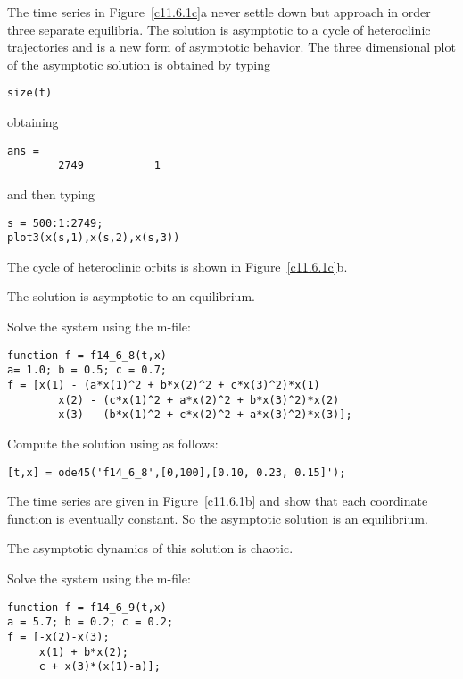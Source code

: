 The time series in Figure~\ref{c11.6.1c}a never settle down but approach in 
order three separate
equilibria.  The solution is asymptotic to a cycle of heteroclinic
trajectories and is a new form of asymptotic behavior.  The three 
dimensional plot of the asymptotic solution is obtained by typing
\begin{verbatim}
size(t)
\end{verbatim}
obtaining
\begin{verbatim}
ans =
        2749           1
\end{verbatim}
and then typing
\begin{verbatim}
s = 500:1:2749;
plot3(x(s,1),x(s,2),x(s,3))
\end{verbatim}
The cycle of heteroclinic orbits is shown in Figure~\ref{c11.6.1c}b.

\begin{figure}[htb]
     \centerline{%
     }
\end{figure}

 \ans The solution is asymptotic to an equilibrium.

\soln Solve the system using the m-file:
\begin{verbatim}
function f = f14_6_8(t,x)
a= 1.0; b = 0.5; c = 0.7;
f = [x(1) - (a*x(1)^2 + b*x(2)^2 + c*x(3)^2)*x(1) 
        x(2) - (c*x(1)^2 + a*x(2)^2 + b*x(3)^2)*x(2)
        x(3) - (b*x(1)^2 + c*x(2)^2 + a*x(3)^2)*x(3)];
\end{verbatim}
Compute the solution using \Matlab as follows:
\begin{verbatim}
[t,x] = ode45('f14_6_8',[0,100],[0.10, 0.23, 0.15]');
\end{verbatim}
The time series are given in Figure~\ref{c11.6.1b} and show
that each coordinate function is eventually constant.  So the asymptotic
solution is an equilibrium.

\begin{figure}[htb]
     \centerline{%
     }
\end{figure}

  \ans The asymptotic dynamics of this solution is chaotic.

\soln Solve the system using the m-file:
\begin{verbatim}
function f = f14_6_9(t,x)
a = 5.7; b = 0.2; c = 0.2;
f = [-x(2)-x(3); 
     x(1) + b*x(2); 
     c + x(3)*(x(1)-a)];
\end{verbatim}

